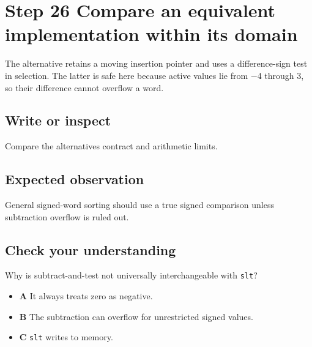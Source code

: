 \section{Step 26 Compare an equivalent implementation within its
  domain}\label{009-sorting-visualizer-s26-step-26-compare-an-equivalent-implementation-within-its-domain}

The alternative retains a moving insertion pointer and uses a
difference-sign test in selection. The latter is safe here because
active values lie from \ensuremath{-}4 through 3, so their difference cannot overflow
a word.

\subsection{Write or
  inspect}\label{009-sorting-visualizer-s26-write-or-inspect}

Compare the alternative\textquotesingle s contract and arithmetic
limits.

\subsection{Expected
  observation}\label{009-sorting-visualizer-s26-expected-observation}

General signed-word sorting should use a true signed comparison unless
subtraction overflow is ruled out.

\subsection{Check your
  understanding}\label{009-sorting-visualizer-s26-check-your-understanding}

Why is subtract-and-test not universally interchangeable with
\texttt{slt}?

\begin{itemize}
  \tightlist
  \item
        \textbf{A} It always treats zero as negative.
  \item
        \textbf{B} The subtraction can overflow for unrestricted signed
        values.
  \item
        \textbf{C} \texttt{slt} writes to memory.
\end{itemize}
